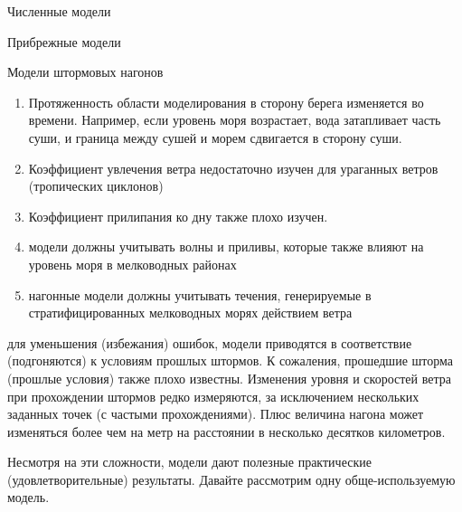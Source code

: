 \begin{chapter}{Численные модели}
\begin{section}{Прибрежные модели}
\begin{paragraph}{Модели штормовых нагонов}
\begin{enumerate}
\item
Протяженность области моделирования в сторону берега изменяется во
времени. Например, если уровень моря возрастает, вода затапливает
часть суши, и граница между сушей и морем сдвигается в сторону суши.
%

\item
Коэффициент увлечения ветра недостаточно изучен для ураганных ветров
(тропических циклонов)
%

\item
Коэффициент прилипания ко дну также плохо изучен. 
%

\item
модели должны учитывать волны и приливы, которые также влияют на
уровень моря в мелководных районах
%

\item
нагонные модели должны учитывать течения, генерируемые в
стратифицированных мелководных морях действием ветра
%
\end{enumerate}
для уменьшения (избежания) ошибок, модели приводятся в соответствие
(подгоняются) к условиям прошлых штормов. К сожаления, прошедшие
шторма (прошлые условия) также плохо известны. Изменения уровня и
скоростей ветра при прохождении штормов редко измеряются, за
исключением нескольких заданных точек (с частыми прохождениями). Плюс
величина нагона может изменяться более чем на метр на расстоянии в
несколько десятков километров.
%

Несмотря на эти сложности, модели дают полезные практические
(удовлетворительные) результаты. Давайте рассмотрим одну
обще-используемую модель.
%


\end{paragraph}
\end{section}
\end{chapter}
